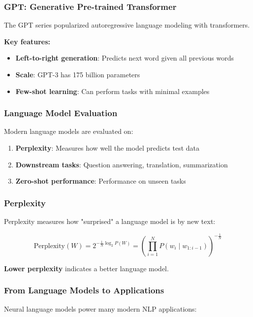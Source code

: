 \documentclass[11pt,a4paper]{article}
\theoremstyle{definition}
\theoremstyle{plain}
\theoremstyle{remark}
\begin{document}
\subsubsection{GPT: Generative Pre-trained Transformer}

The GPT series popularized autoregressive language modeling with transformers.

\textbf{Key features:}
\begin{itemize}
    \item \textbf{Left-to-right generation}: Predicts next word given all previous words
    \item \textbf{Scale}: GPT-3 has 175 billion parameters
    \item \textbf{Few-shot learning}: Can perform tasks with minimal examples
\end{itemize}

\subsubsection{Language Model Evaluation}

Modern language models are evaluated on:

\begin{enumerate}
    \item \textbf{Perplexity}: Measures how well the model predicts test data
    \item \textbf{Downstream tasks}: Question answering, translation, summarization
    \item \textbf{Zero-shot performance}: Performance on unseen tasks
\end{enumerate}

\subsubsection{Perplexity}

Perplexity measures how "surprised" a language model is by new text:

\[
\text{Perplexity}(W) = 2^{-\frac{1}{N} \log_2 P(W)} = \left( \prod_{i=1}^N P(w_i \mid w_{1:i-1}) \right)^{-\frac{1}{N}}
\]

\textbf{Lower perplexity} indicates a better language model.

\subsubsection{From Language Models to Applications}

Neural language models power many modern NLP applications:
\end{document}
